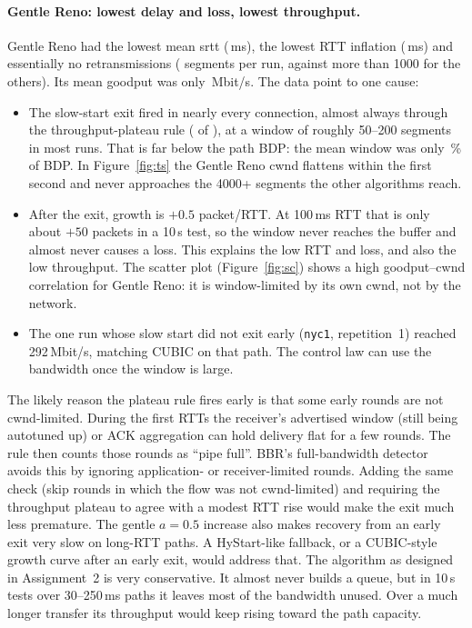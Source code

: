 \documentclass[11pt]{article}
\newcommand{\GR}{Gentle Reno}
\begin{document}
\paragraph{\GR{}: lowest delay and loss, lowest throughput.}
\GR{} had the lowest mean srtt (\,ms), the lowest RTT inflation
(\,ms) and essentially no retransmissions
( segments per run, against more than 1000 for the others). Its
mean goodput was only \,Mbit/s. The data point to one cause:
\begin{itemize}
  \item The slow-start exit fired in nearly every connection, almost always through the
  throughput-plateau rule ( of ), at a window of roughly
  50--200 segments in most runs. That is far below the path BDP: the mean window was only
  \,\% of BDP. In Figure~\ref{fig:ts} the \GR{} cwnd flattens within
  the first second and never approaches the 4000+ segments the other algorithms reach.
  \item After the exit, growth is $+0.5$ packet/RTT. At 100\,ms RTT that is only about $+50$ packets in
  a 10\,s test, so the window never reaches the buffer and almost never causes a loss. This explains the
  low RTT and loss, and also the low throughput. The scatter plot (Figure~\ref{fig:sc}) shows a high
  goodput--cwnd correlation for \GR{}: it is window-limited by its own cwnd, not by the network.
  \item The one run whose slow start did not exit early (\texttt{nyc1}, repetition~1) reached
  292\,Mbit/s, matching CUBIC on that path. The control law can use the bandwidth once the window
  is large.
\end{itemize}
The likely reason the plateau rule fires early is that some early rounds are not cwnd-limited.
During the first RTTs the receiver's advertised window (still being autotuned up) or ACK
aggregation can hold delivery flat for a few rounds. The rule then counts those rounds as ``pipe
full''. BBR's full-bandwidth detector avoids this by ignoring application- or receiver-limited
rounds. Adding the same check (skip rounds in which the flow was not cwnd-limited) and requiring the
throughput plateau to agree with a modest RTT rise would make the exit much less premature. The
gentle $a=0.5$ increase also makes recovery from an early exit very slow on long-RTT paths. A
HyStart-like fallback, or a CUBIC-style growth curve after an early exit, would address that. The
algorithm as designed in Assignment~2 is very conservative. It almost never builds a queue, but
in 10\,s tests over 30--250\,ms paths it leaves most of the bandwidth unused. Over a much longer
transfer its throughput would keep rising toward the path capacity.
\end{document}
